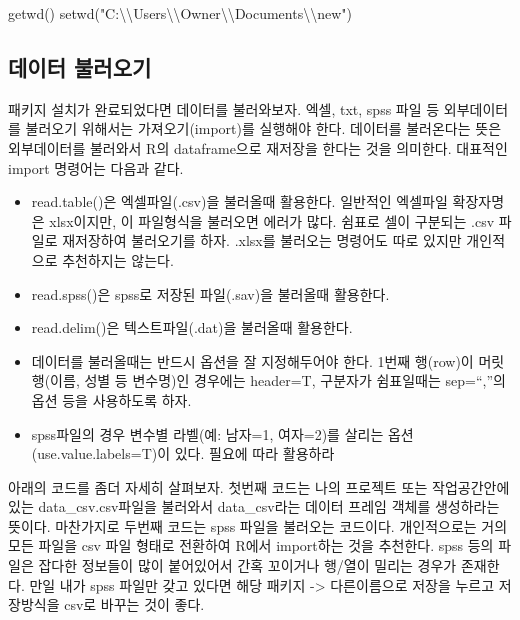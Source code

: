 \documentclass[
]{book}
\newenvironment{Shaded}{\begin{snugshade}}{\end{snugshade}}
\newcommand{\FunctionTok}[1]{\textcolor[rgb]{0.00,0.00,0.00}{#1}}
\newcommand{\NormalTok}[1]{#1}
\newcommand{\SpecialCharTok}[1]{\textcolor[rgb]{0.00,0.00,0.00}{#1}}
\newcommand{\StringTok}[1]{\textcolor[rgb]{0.31,0.60,0.02}{#1}}
\providecommand{\tightlist}{%
  \setlength{\itemsep}{0pt}\setlength{\parskip}{0pt}}
\theoremstyle{definition}
\theoremstyle{definition}
\theoremstyle{definition}
\theoremstyle{definition}
\theoremstyle{remark}
\begin{document}
\begin{Shaded}
\begin{Highlighting}[]
\FunctionTok{getwd}\NormalTok{()}
\FunctionTok{setwd}\NormalTok{(}\StringTok{"C:}\SpecialCharTok{\textbackslash{}\textbackslash{}}\StringTok{Users}\SpecialCharTok{\textbackslash{}\textbackslash{}}\StringTok{Owner}\SpecialCharTok{\textbackslash{}\textbackslash{}}\StringTok{Documents}\SpecialCharTok{\textbackslash{}\textbackslash{}}\StringTok{new"}\NormalTok{) }
\end{Highlighting}
\end{Shaded}

\hypertarget{uxb370uxc774uxd130-uxbd88uxb7ecuxc624uxae30}{%
\subsection{데이터 불러오기}\label{uxb370uxc774uxd130-uxbd88uxb7ecuxc624uxae30}}

패키지 설치가 완료되었다면 데이터를 불러와보자. 엑셀, txt, spss 파일 등 외부데이터를 불러오기 위해서는 가져오기(import)를 실행해야 한다. 데이터를 불러온다는 뜻은 외부데이터를 불러와서 R의 dataframe으로 재저장을 한다는 것을 의미한다. 대표적인 import 명령어는 다음과 같다.

\begin{itemize}
\tightlist
\item
  read.table()은 엑셀파일(.csv)을 불러올때 활용한다. 일반적인 엑셀파일 확장자명은 xlsx이지만, 이 파일형식을 불러오면 에러가 많다. 쉼표로 셀이 구분되는 .csv 파일로 재저장하여 불러오기를 하자. .xlsx를 불러오는 명령어도 따로 있지만 개인적으로 추천하지는 않는다.
\item
  read.spss()은 spss로 저장된 파일(.sav)을 불러올때 활용한다.
\item
  read.delim()은 텍스트파일(.dat)을 불러올때 활용한다.
\item
  데이터를 불러올때는 반드시 옵션을 잘 지정해두어야 한다. 1번째 행(row)이 머릿행(이름, 성별 등 변수명)인 경우에는 header=T, 구분자가 쉼표일때는 sep=``,''의 옵션 등을 사용하도록 하자.
\item
  spss파일의 경우 변수별 라벨(예: 남자=1, 여자=2)를 살리는 옵션(use.value.labels=T)이 있다. 필요에 따라 활용하라
\end{itemize}

아래의 코드를 좀더 자세히 살펴보자. 첫번째 코드는 나의 프로젝트 또는 작업공간안에 있는 data\_csv.csv파일을 불러와서 data\_csv라는 데이터 프레임 객체를 생성하라는 뜻이다. 마찬가지로 두번째 코드는 spss 파일을 불러오는 코드이다.
개인적으로는 거의 모든 파일을 csv 파일 형태로 전환하여 R에서 import하는 것을 추천한다. spss 등의 파일은 잡다한 정보들이 많이 붙어있어서 간혹 꼬이거나 행/열이 밀리는 경우가 존재한다. 만일 내가 spss 파일만 갖고 있다면 해당 패키지 -\textgreater{} 다른이름으로 저장을 누르고 저장방식을 csv로 바꾸는 것이 좋다.
\end{document}
